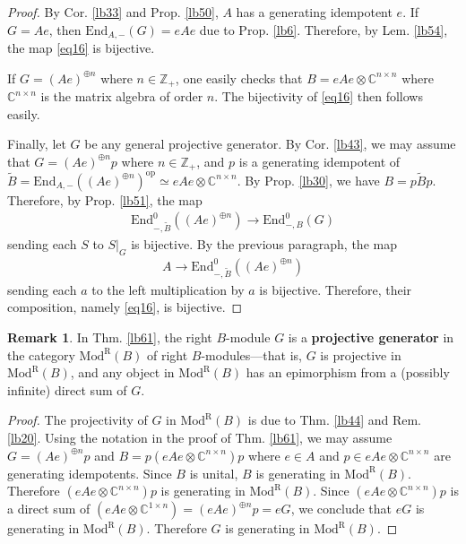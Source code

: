 \documentclass[11pt,b5paper,notitlepage]{article}
\theoremstyle{definition}
\newtheorem{rem}[df]{Remark}
\theoremstyle{plain}
\newcommand{\wtd}{\widetilde}
\newcommand{\End}{\mathrm{End}} %
\newcommand{\opp}{\mathrm{op}}
\newcommand{\Cbb}{\mathbb C}
\newcommand{\Zbb}{\mathbb Z}
\newcommand{\ModR}{\mathrm{Mod}^{\mathrm R}}
\numberwithin{equation}{section}
\begin{document}
\begin{proof}
By Cor. \ref{lb33} and Prop. \ref{lb50}, $A$ has a generating idempotent $e$. If $G=Ae$, then $\End_{A,-}(G)=eAe$ due to Prop. \ref{lb6}. Therefore, by Lem. \ref{lb54}, the map \eqref{eq16} is bijective.

If $G=(Ae)^{\oplus n}$ where $n\in\Zbb_+$, one easily checks that $B=eAe\otimes\Cbb^{n\times n}$ where $\Cbb^{n\times n}$ is the matrix algebra of order $n$. The bijectivity of \eqref{eq16} then follows easily.

Finally, let $G$ be any general projective generator. By Cor. \ref{lb43}, we may assume that $G=(Ae)^{\oplus n}p$ where $n\in\Zbb_+$, and $p$ is a generating idempotent of $\wtd B=\End_{A,-}((Ae)^{\oplus n})^\opp\simeq eAe\otimes\Cbb^{n\times n}$. By Prop. \ref{lb30}, we have $B=p\wtd Bp$. Therefore, by Prop. \ref{lb51}, the map 
\begin{align*}
\End^0_{-,\wtd B}((Ae)^{\oplus n})\rightarrow \End^0_{-,B}(G)
\end{align*}
sending each $S$ to $S|_G$ is bijective. By the previous paragraph, the map
\begin{align*}
A\rightarrow \End^0_{-,\wtd B}((Ae)^{\oplus n})
\end{align*}
sending each $a$ to the left multiplication by $a$ is bijective. Therefore, their composition, namely \eqref{eq16}, is bijective.
\end{proof}


\begin{rem}\label{lb62}
In Thm. \ref{lb61}, the right $B$-module $G$ is a \textbf{projective generator} in the category $\ModR(B)$ of right $B$-modules---that is, $G$ is projective in $\ModR(B)$, and any object in $\ModR(B)$ has an epimorphism from a (possibly infinite) direct sum of $G$.
\end{rem}

\begin{proof}
The projectivity of $G$ in $\ModR(B)$ is due to Thm. \ref{lb44} and Rem. \ref{lb20}. Using the notation in the proof of Thm. \ref{lb61}, we may assume $G=(Ae)^{\oplus n}p$ and $B=p(eAe\otimes\Cbb^{n\times n})p$ where $e\in A$ and $p\in eAe\otimes\Cbb^{n\times n}$ are generating idempotents. Since $B$ is unital, $B$ is generating in $\ModR(B)$. Therefore $(eAe\otimes\Cbb^{n\times n})p$ is generating in $\ModR(B)$. Since $(eAe\otimes\Cbb^{n\times n})p$  is a direct sum of $(eAe\otimes\Cbb^{1\times n})=(eAe)^{\oplus n}p=eG$, we conclude that $eG$ is generating in $\ModR(B)$. Therefore $G$ is generating in $\ModR(B)$.
\end{proof}
\end{document}
